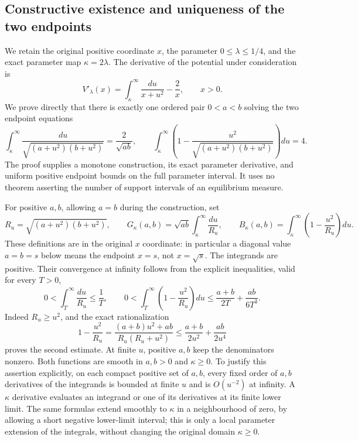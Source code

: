 \subsection{Constructive existence and uniqueness of the two endpoints}
\label{sec:shifted-gamma-endpoint-existence}

We retain the original positive coordinate $x$, the parameter
$0\leq\lambda\leq1/4$, and the exact parameter map $\kappa=2\lambda$.
The derivative of the potential under consideration is
\begin{equation}\tag{KEP1}
 V'_\lambda(x)=\int_\kappa^\infty\frac{du}{x+u^2}-\frac2x,
 \qquad x>0.
\end{equation}
We prove directly that there is exactly one ordered pair $0<a<b$ solving
the two endpoint equations
\begin{equation}\tag{KEP2}
 \int_\kappa^\infty\frac{du}{\sqrt{(a+u^2)(b+u^2)}}
       =\frac2{\sqrt{ab}},\qquad
 \int_\kappa^\infty\left(1-
       \frac{u^2}{\sqrt{(a+u^2)(b+u^2)}}\right)du=4.
\end{equation}
The proof supplies a monotone construction, its exact parameter derivative,
and uniform positive endpoint bounds on the full parameter interval. It
uses no theorem asserting the number of support intervals of an
equilibrium measure.

For positive $a,b$, allowing $a=b$ during the construction, set
\begin{equation}\tag{KEP3}
 R_u=\sqrt{(a+u^2)(b+u^2)},\qquad
 G_\kappa(a,b)=\sqrt{ab}\int_\kappa^\infty\frac{du}{R_u},\qquad
 B_\kappa(a,b)=\int_\kappa^\infty\left(1-\frac{u^2}{R_u}\right)du.
\end{equation}
These definitions are in the original $x$ coordinate: in particular a
diagonal value $a=b=s$ below means the endpoint $x=s$, not $x=\sqrt{s}$.
The integrands are positive. Their convergence at infinity follows from
the explicit inequalities, valid for every $T>0$,
\begin{equation}\tag{KEP4}
 0<\int_T^\infty\frac{du}{R_u}\leq\frac1T,\qquad
 0<\int_T^\infty\left(1-\frac{u^2}{R_u}\right)du
 \leq\frac{a+b}{2T}+\frac{ab}{6T^3}.
\end{equation}
Indeed $R_u\geq u^2$, and the exact rationalization
\[
 1-\frac{u^2}{R_u}
 =\frac{(a+b)u^2+ab}{R_u(R_u+u^2)}
 \leq\frac{a+b}{2u^2}+\frac{ab}{2u^4}
\]
proves the second estimate. At finite $u$, positive $a,b$ keep the
denominators nonzero. Both functions are smooth in $a,b>0$ and $\kappa\geq0$.
To justify this assertion explicitly, on each compact positive set of
$a,b$, every fixed order of $a,b$ derivatives of the integrands is bounded
at finite $u$ and is $O(u^{-2})$ at infinity. A $\kappa$ derivative evaluates
an integrand or one of its derivatives at its finite lower limit. The
same formulas extend smoothly to $\kappa$ in a neighbourhood of zero, by
allowing a short negative lower-limit interval; this is only a local
parameter extension of the integrals, without changing the original
domain $\kappa\geq0$.

